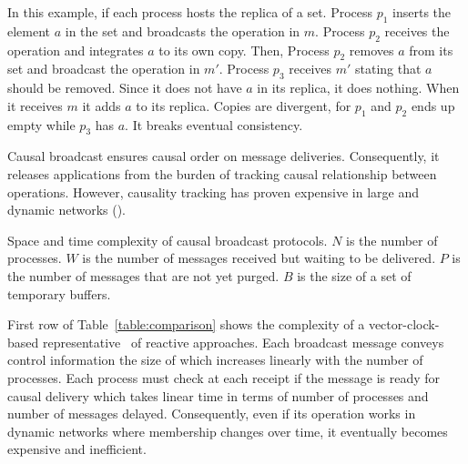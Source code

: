 In this example, if each process hosts the replica of a set. Process $p_1$
inserts the element $a$ in the set and broadcasts the operation in $m$. Process
$p_2$ receives the operation and integrates $a$ to its own copy. Then, Process
$p_2$ removes $a$ from its set and broadcast the operation in $m'$. Process
$p_3$ receives $m'$ stating that $a$ should be removed. Since it does not have
$a$ in its replica, it does nothing. When it receives $m$ it adds $a$ to its
replica. Copies are divergent, for $p_1$ and $p_2$ ends up empty while $p_3$ has
$a$. It breaks eventual consistency.

Causal broadcast ensures causal order on message deliveries. Consequently, it
releases applications from the burden of tracking causal relationship between
operations. However, causality tracking has proven expensive in large and
dynamic networks (\REF).

\begin{table}
  \caption{\label{table:comparison} Space and time complexity of causal broadcast protocols. $N$ is the number of processes. $W$ is the number of messages received but waiting to be delivered.
    $P$ is the number of messages that are not yet purged.
    $B$ is the size of a set of temporary buffers.}
  
\end{table}



First row of Table~\ref{table:comparison} shows the complexity of a
vector-clock-based representative~\cite{schwarz1994detecting} of reactive
approaches. %
Each broadcast message conveys control information the size of which increases
linearly with the number of processes. Each process must check at each receipt
if the message is ready for causal delivery which takes linear time in terms of
number of processes and number of messages delayed. Consequently, even if its
operation works in dynamic networks where membership changes over time, it
eventually becomes expensive and inefficient.

